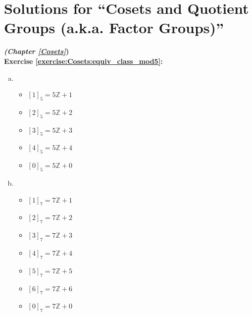 
\section{Solutions for ``Cosets and Quotient Groups (a.k.a. Factor Groups)''}
\label{sec:AnswerKey:Cosets}
\noindent\textbf{\textit{(Chapter \ref{Cosets}})}\bigskip
\\
\textbf{Exercise \ref{exercise:Cosets:equiv_class_mod5}:}
\begin{multicols}{2}
\begin{enumerate}[(a)]
\item
	\begin{itemize}
	\item
	$[1]_5 = 5{\mathbb Z} + 1$
	\item
	$[2]_5 = 5{\mathbb Z} + 2$
	\item
	$[3]_5 = 5{\mathbb Z} + 3$
	\item
	$[4]_5 = 5{\mathbb Z} + 4$
	\item
	$[0]_5 = 5{\mathbb Z} + 0$
	\end{itemize}
\columnbreak	
\item
	\begin{itemize}
	\item
	$[1]_7 = 7{\mathbb Z} + 1$
	\item
	$[2]_7 = 7{\mathbb Z} + 2$
	\item
	$[3]_7 = 7{\mathbb Z} + 3$
	\item
	$[4]_7 = 7{\mathbb Z} + 4$
	\item
	$[5]_7 = 7{\mathbb Z} + 5$
	\item
	$[6]_7 = 7{\mathbb Z} + 6$
	\item
	$[0]_7 = 7{\mathbb Z} + 0$
	\end{itemize}
\end{enumerate}
\end{multicols}

